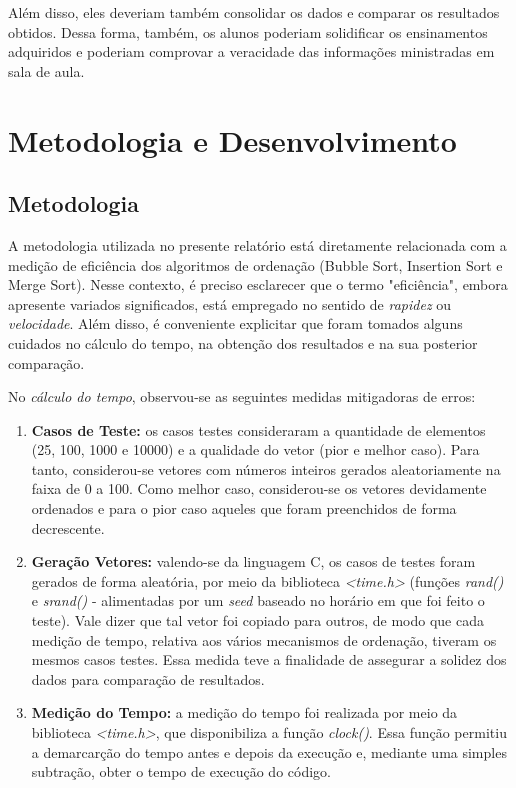 \documentclass[a4paper, 12pt]{article}
\begin{document}
Além disso, eles deveriam também consolidar os dados e comparar os resultados obtidos. Dessa forma, também, os alunos poderiam solidificar os ensinamentos adquiridos e poderiam comprovar a veracidade das informações ministradas em sala de aula.

\section{Metodologia e Desenvolvimento}

\subsection{Metodologia}
\tab{ }A metodologia utilizada no presente relatório está diretamente relacionada com a medição de eficiência dos algoritmos de ordenação (Bubble Sort, Insertion Sort e Merge Sort). Nesse contexto, é preciso esclarecer que o termo "eficiência", embora apresente variados significados, está empregado no sentido de \textit{rapidez} ou \textit{velocidade}. Além disso, é conveniente explicitar que foram tomados alguns cuidados no cálculo do tempo, na obtenção dos resultados e na sua posterior comparação. 

No \textit{cálculo do tempo}, observou-se as seguintes medidas mitigadoras de erros:
\begin{enumerate}
    \item \textbf{Casos de Teste:} os casos testes consideraram a quantidade de elementos (25, 100, 1000 e 10000) e a qualidade do vetor (pior e melhor caso). Para tanto, considerou-se vetores com números inteiros gerados aleatoriamente na faixa de 0 a 100. Como melhor caso, considerou-se os vetores devidamente ordenados e para o pior caso aqueles que foram preenchidos de forma decrescente.
    \item \textbf{Geração Vetores:} valendo-se da linguagem C, os casos de testes foram gerados de forma aleatória, por meio da biblioteca \textit{<time.h>} (funções \textit{rand()} e \textit{srand()} - alimentadas por um \textit{seed} baseado no horário em que foi feito o teste). Vale dizer que tal vetor foi copiado para outros, de modo que cada medição de tempo, relativa aos vários mecanismos de ordenação, tiveram os mesmos casos testes. Essa medida teve a finalidade de assegurar a solidez dos dados para comparação de resultados.
    \item \textbf{Medição do Tempo:} a medição do tempo foi realizada por meio da biblioteca \textit{<time.h>}, que disponibiliza a função \textit{clock()}. Essa função permitiu a demarcarção do tempo antes e depois da execução e, mediante uma simples subtração, obter o tempo de execução do código.
\end{enumerate}
\end{document}
